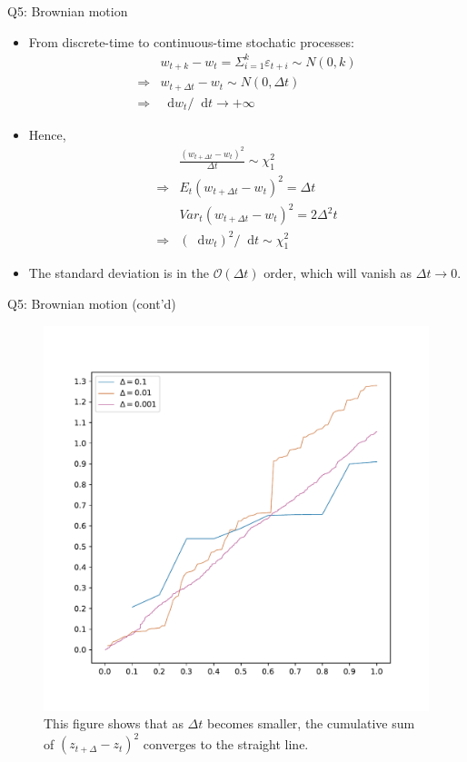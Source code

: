 \documentclass[10pt,t]{beamer}
\newcommand*\diff{\mathop{}\!\mathrm{d}}
\begin{document}
\begin{frame}{Q5: Brownian motion}
\begin{itemize}
  \item From discrete-time to continuous-time stochatic processes:
  \begin{equation*}
  \begin{split}
  & w_{t+k} - w_t = \Sigma_{i = 1}^k \varepsilon_{t+i} \sim N(0, k) \\
  \Rightarrow & w_{t+\Delta t} - w_t \sim N(0, \Delta t) \\
  \Rightarrow & \diff w_t / \diff t \rightarrow +\infty
  \end{split}
  \end{equation*}
  \item Hence,
  \begin{equation*}
  \begin{split}
  &   \frac{(w_{t+\Delta t} - w_t)^2}{\Delta t} \sim \chi_1^2 \\
  \Rightarrow & E_t(w_{t+\Delta t} - w_t)^2 = \Delta t \\
  & Var_t(w_{t+\Delta t} - w_t)^2 = 2 \Delta^2 t \\
  \Rightarrow & (\diff w_t)^2 / \diff t \sim \chi_1^2
  \end{split}
  \end{equation*}
  \item The standard deviation is in the $\mathcal{O}(\Delta t)$ order, which will vanish as $\Delta t \rightarrow 0$.
\end{itemize}
\end{frame}

\begin{frame}{Q5: Brownian motion (cont'd)}
\begin{figure}[h!]
\centering
\includegraphics[width=0.5\linewidth]{q5fig1.pdf}
\caption{This figure shows that as $\Delta t$ becomes smaller, the cumulative sum of $(z_{t+\Delta} - z_t)^2$ converges to the straight line.}
\end{figure}
\end{frame}
\end{document}
